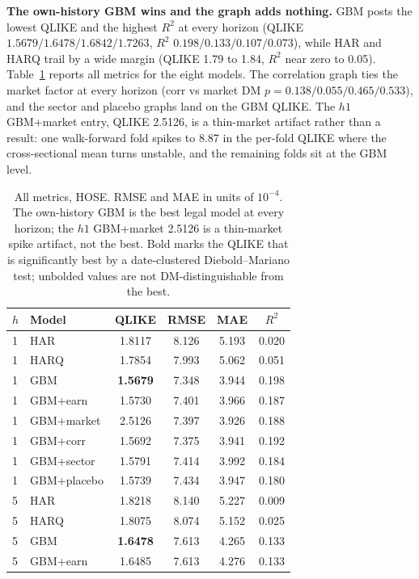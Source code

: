 \documentclass{llncs}
\begin{document}
\textbf{The own-history GBM wins and the graph adds nothing.} GBM posts the lowest QLIKE and the highest $R^2$ at
every horizon (QLIKE $1.5679/1.6478/1.6842/1.7263$, $R^2$ $0.198/0.133/0.107/0.073$), while HAR and HARQ trail by a
wide margin (QLIKE 1.79 to 1.84, $R^2$ near zero to 0.05). Table~\ref{tab:hose-allmetrics} reports all metrics for the eight models. The
correlation graph ties the market factor at every horizon (corr vs market DM $p=0.138/0.055/0.465/0.533$), and the
sector and placebo graphs land on the GBM QLIKE. The $h1$ GBM+market entry, QLIKE 2.5126, is a thin-market
artifact rather than a result: one walk-forward fold spikes to 8.87 in the per-fold QLIKE where the
cross-sectional mean turns unstable, and the remaining folds sit at the GBM level.

\begin{table}[t]
\centering
\caption{All metrics, HOSE. RMSE and MAE in units of $10^{-4}$. The own-history GBM is the best legal model at
every horizon; the $h1$ GBM+market 2.5126 is a thin-market spike artifact, not the best. Bold marks the QLIKE that
is significantly best by a date-clustered Diebold--Mariano test; unbolded values are not DM-distinguishable from
the best.}
\label{tab:hose-allmetrics}
\footnotesize
\setlength{\tabcolsep}{6pt}
\begin{tabular}{llcccc}
\toprule
$h$ & Model & QLIKE & RMSE & MAE & $R^2$ \\
\midrule
1  & HAR         & 1.8117 & 8.126 & 5.193 & 0.020 \\
1  & HARQ        & 1.7854 & 7.993 & 5.062 & 0.051 \\
1  & GBM         & \textbf{1.5679} & 7.348 & 3.944 & 0.198 \\
1  & GBM+earn    & 1.5730 & 7.401 & 3.966 & 0.187 \\
1  & GBM+market  & 2.5126 & 7.397 & 3.926 & 0.188 \\
1  & GBM+corr    & 1.5692 & 7.375 & 3.941 & 0.192 \\
1  & GBM+sector  & 1.5791 & 7.414 & 3.992 & 0.184 \\
1  & GBM+placebo & 1.5739 & 7.434 & 3.947 & 0.180 \\
\midrule
5  & HAR         & 1.8218 & 8.140 & 5.227 & 0.009 \\
5  & HARQ        & 1.8075 & 8.074 & 5.152 & 0.025 \\
5  & GBM         & \textbf{1.6478} & 7.613 & 4.265 & 0.133 \\
5  & GBM+earn    & 1.6485 & 7.613 & 4.276 & 0.133 \\

\end{tabular}
\end{table}
\end{document}
